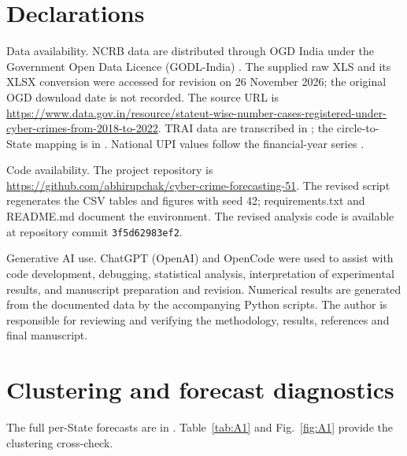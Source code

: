\documentclass[runningheads]{llncs}
\begin{document}
\FloatBarrier
\section*{Declarations}
Data availability. NCRB data are distributed through OGD India under the Government Open Data Licence (GODL-India) \cite{ref2}. The supplied raw XLS and its XLSX conversion were accessed for revision on 26 November 2026; the original OGD download date is not recorded. The source URL is \url{https://www.data.gov.in/resource/stateut-wise-number-cases-registered-under-cyber-crimes-from-2018-to-2022}. TRAI data are transcribed in ; the circle-to-State mapping is in . National UPI values follow the financial-year series \cite{ref18}.

Code availability. The project repository is \url{https://github.com/abhirupchak/cyber-crime-forecasting-51}. The revised script  regenerates the CSV tables and figures with seed 42; requirements.txt and README.md document the environment. The revised analysis code is available at repository commit \texttt{3f5d62983ef2}.

Generative AI use. ChatGPT (OpenAI) and OpenCode were used to assist with code development, debugging, statistical analysis, interpretation of experimental results, and manuscript preparation and revision. Numerical results are generated from the documented data by the accompanying Python scripts. The author is responsible for reviewing and verifying the methodology, results, references and final manuscript.


\FloatBarrier
\appendix
\renewcommand{\thefigure}{\thesection\arabic{figure}}
\renewcommand{\thetable}{\thesection\arabic{table}}
\setcounter{figure}{0}\setcounter{table}{0}
\section{Clustering and forecast diagnostics}\label{app:A}
The full per-State forecasts are in . Table~\ref{tab:A1} and Fig.~\ref{fig:A1} provide the clustering cross-check.
\end{document}
